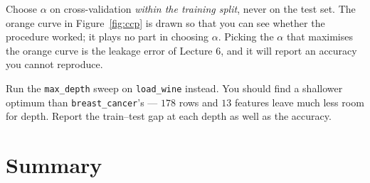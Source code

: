 \documentclass[11pt]{article}
\begin{document}
\begin{caution}
Choose $\alpha$ on cross-validation \emph{within the training split}, never on
the test set. The orange curve in Figure~\ref{fig:ccp} is drawn so that you
can see whether the procedure worked; it plays no part in choosing $\alpha$.
Picking the $\alpha$ that maximises the orange curve is the leakage error of
Lecture 6, and it will report an accuracy you cannot reproduce.
\end{caution}

\begin{tryit}
Run the \texttt{max\_depth} sweep on \texttt{load\_wine} instead. You should
find a shallower optimum than \texttt{breast\_cancer}'s --- $178$ rows and $13$
features leave much less room for depth. Report the train--test gap at each
depth as well as the accuracy.
\end{tryit}

\notesources{\AMLUnitVISources}

\section{Summary}
\end{document}
